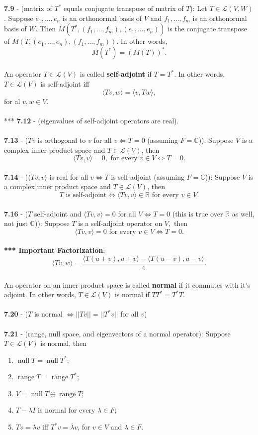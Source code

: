 \documentclass{article}
\DeclareMathOperator{\Null}{null}
\DeclareMathOperator{\Range}{range}
\theoremstyle{definition}
\begin{document}
\textbf{7.9} - (matrix of $T^*$ equals conjugate transpose of matrix of $T$): Let $T \in \mathcal{L}(V, W)$. Suppose $e_1, \dots, e_n$ is an orthonormal basis of $V$ and $f_1, \dots, f_m$ is an orthonormal basis of $W$. Then $M(T^*, (f_1, \dots, f_m), (e_1, \dots, e_n))$ is the conjugate transpose of $M(T, (e_1, \dots, e_n), (f_1, \dots, f_m))$. In other words, $$M(T^*) = (M(T))^*.$$ \\
An operator $T \in \mathcal{L}(V)$ is called \textbf{self-adjoint} if $T = T^*$. In other words, $T \in \mathcal{L}(V)$ is self-adjoint iff $$\langle Tv, w \rangle = \langle v, Tw \rangle,$$ for al $v, w \in V$. \\ \\
*** \textbf{7.12} - (eigenvalues of self-adjoint operators are real). \\ \\
\textbf{7.13} - ($Tv$ is orthogonal to $v$ for all $v \iff T = 0$ (assuming $F = \mathbb{C}$)): Suppose $V$ is a complex inner product space and $T \in \mathcal{L}(V)$, then $$\langle Tv, v \rangle = 0, \text{ for every } v \in V \iff T = 0.$$ \\
\textbf{7.14} - ($\langle Tv, v \rangle$ is real for all $v \iff T$ is self-adjoint (assuming $F = \mathbb{C}$)): Suppose $V$ is a complex inner product space and $T \in \mathcal{L}(V)$, then $$T \text{ is self-adjoint} \iff \langle Tv, v \rangle \in \mathbb{R} \text{ for every } v \in V.$$ \\
\textbf{7.16} - ($T$ self-adjoint and $\langle Tv, v \rangle = 0$ for all $V \iff T = 0$ (this is true over $\mathbb{R}$ as well, not just $\mathbb{C}$)): Suppose $T$ is a self-adjoint operator on $V,$ then $$\langle Tv, v \rangle = 0 \text{ for every } v \in V \iff T = 0.$$ \\
\textbf{*** Important Factorization}: $$\langle Tv, w \rangle = \frac{\langle T(u + v), u + v \rangle - \langle T(u - v), u - v \rangle}{4}.$$ \\
An operator on an inner product space is called \textbf{normal} if it commutes with it's adjoint. In other words, $T \in \mathcal{L}(V)$ is normal if $TT^* = T^*T$. \\ \\
\textbf{7.20} - ($T$ is normal $\iff ||Tv|| = ||T^* v||$ for all $v$) \\ \\
\textbf{7.21} - (range, null space, and eigenvectors of a normal operator): Suppose $T \in \mathcal{L}(V)$ is normal, then \begin{enumerate}
    \item $\Null{T} = \Null{T^*}$;
    \item $\Range{T} = \Range{T^*}$;
    \item $V = \Null{T} \oplus \Range{T}$;
    \item $T - \lambda I$ is normal for every $\lambda \in F$;
    \item $Tv = \lambda v$ iff $T^* v = \overline{\lambda} v$, for $v \in V$ and $\lambda \in F$.
\end{enumerate} $ $ \\
\end{document}

